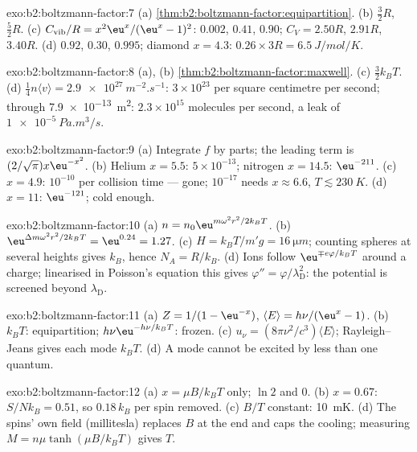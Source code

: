 \begin{solution}{exo:b2:boltzmann-factor:7}
(a) \cref{thm:b2:boltzmann-factor:equipartition}. (b) $\tfrac32R$,
$\tfrac52R$. (c) $C_{\text{vib}}/R = x^2\eu^x/(\eu^x - 1)^2$: $0.002$, $0.41$, $0.90$;
$C_V = 2.50R$, $2.91R$, $3.40R$. (d) $0.92$, $0.30$, $0.995$; diamond $x = 4.3$:
$0.26 \times 3R = \qty{6.5}{J/mol/K}$.
\end{solution}

\begin{solution}{exo:b2:boltzmann-factor:8}
(a), (b) \cref{thm:b2:boltzmann-factor:maxwell}. (c) $\tfrac32k_BT$. (d)
$\tfrac14n\langle v\rangle = \qty{2.9e27}{m^{-2}.s^{-1}}$: $3 \times 10^{23}$ per square
centimetre per second; through \qty{7.9e-13}{m^2}: $2.3 \times 10^{15}$
molecules per second, a leak of $\qty{1e-5}{Pa.m^3/s}$.
\end{solution}

\begin{solution}{exo:b2:boltzmann-factor:9}
(a) Integrate $f$ by parts; the leading term is $(2/\sqrt\pi)x\eu^{-x^2}$. (b)
Helium $x = 5.5$: $5 \times 10^{-13}$; nitrogen $x = 14.5$: $\eu^{-211}$. (c) $x =
4.9$: $10^{-10}$ per collision time --- gone; $10^{-17}$ needs $x \approx 6.6$,
$T \lesssim \qty{230}{K}$. (d) $x = 11$: $\eu^{-121}$; cold enough.
\end{solution}

\begin{solution}{exo:b2:boltzmann-factor:10}
(a) $n = n_0\eu^{m\omega^2r^2/2k_BT}$. (b) $\eu^{\Delta m\omega^2r^2/2k_BT} = \eu^{0.24} =
1.27$. (c) $H = k_BT/m'g = \qty{16}{\micro m}$; counting spheres at
several heights gives $k_B$, hence $N_A = R/k_B$. (d) Ions follow
$\eu^{\mp e\varphi/k_BT}$ around a charge; linearised in Poisson's equation
this gives $\varphi'' = \varphi/\lambda_{\text{D}}^2$: the potential is screened
beyond $\lambda_{\text{D}}$.
\end{solution}

\begin{solution}{exo:b2:boltzmann-factor:11}
(a) $Z = 1/(1 - \eu^{-x})$, $\langle E\rangle = h\nu/(\eu^x - 1)$. (b) $k_BT$:
equipartition; $h\nu\eu^{-h\nu/k_BT}$: frozen. (c) $u_\nu = (8\pi\nu^2/c^3)\langle E
\rangle$; Rayleigh--Jeans gives each mode $k_BT$. (d) A mode cannot be
excited by less than one quantum.
\end{solution}

\begin{solution}{exo:b2:boltzmann-factor:12}
(a) $x = \mu B/k_BT$ only; $\ln 2$ and $0$. (b) $x = 0.67$: $S/Nk_B = 0.51$, so
$0.18\,k_B$ per spin removed. (c) $B/T$ constant: \qty{10}{mK}. (d) The spins'
own field (millitesla) replaces $B$ at the end and caps the cooling;
measuring $M = n\mu\tanh(\mu B/k_BT)$ gives $T$.
\end{solution}

